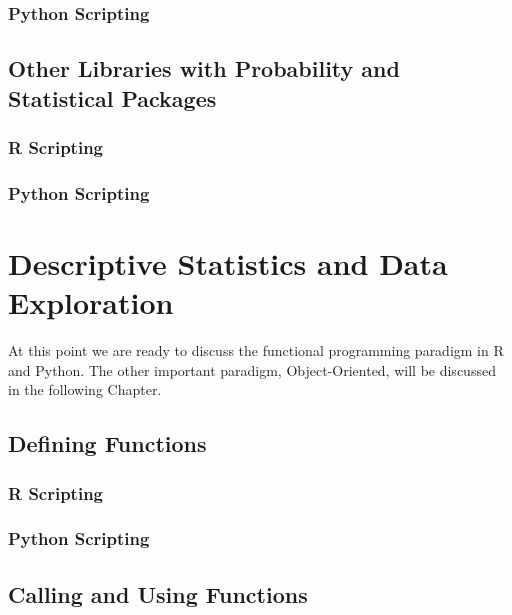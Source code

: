 \documentclass[]{book}
\theoremstyle{definition}
\theoremstyle{definition}
\theoremstyle{definition}
\theoremstyle{remark}
\begin{document}
\subsection{Python Scripting}\label{python-scripting-5}

\section{Other Libraries with Probability and Statistical
Packages}\label{other-libraries-with-probability-and-statistical-packages}

\subsection{R Scripting}\label{r-scripting-6}

\subsection{Python Scripting}\label{python-scripting-6}

\chapter{Descriptive Statistics and Data
Exploration}\label{descriptive-statistics-and-data-exploration}

At this point we are ready to discuss the functional programming
paradigm in R and Python. The other important paradigm, Object-Oriented,
will be discussed in the following Chapter.

\section{Defining Functions}\label{defining-functions-1}

\subsection{R Scripting}\label{r-scripting-7}

\subsection{Python Scripting}\label{python-scripting-7}

\section{Calling and Using
Functions}\label{calling-and-using-functions-1}
\end{document}
